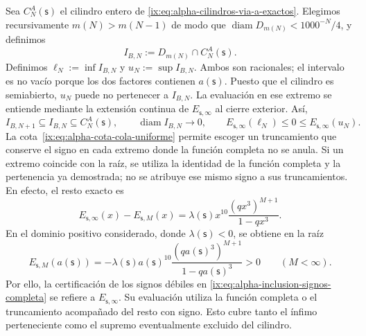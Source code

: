 Sea \(C_N^A(\mathsf s)\) el cilindro entero de
\eqref{ix:eq:alpha-cilindros-via-a-exactos}. Elegimos recursivamente
\(m(N)>m(N-1)\) de modo que
\(\operatorname{diam}D_{m(N)}<1000^{-N}/4\), y definimos
\begin{equation}
I_{B,N}:=D_{m(N)}\cap C_N^A(\mathsf s).
 \label{ix:eq:alpha-intervalos-b-completos}
\end{equation}
Definimos
\(\ell_N:=\inf I_{B,N}\) y \(u_N:=\sup I_{B,N}\). Ambos son racionales;
el intervalo es no vacío porque los dos factores contienen
\(a(\mathsf s)\). Puesto que el cilindro es semiabierto, \(u_N\) puede no
pertenecer a \(I_{B,N}\). La evaluación en ese extremo se entiende mediante
la extensión continua de \(E_{\mathsf s,\infty}\) al cierre exterior. Así,
\begin{equation}
 I_{B,N+1}\subseteq I_{B,N}\subseteq C_N^A(\mathsf s),
 \qquad \operatorname{diam}I_{B,N}\longrightarrow0,
 \qquad E_{\mathsf s,\infty}(\ell_N)\leq0\leq
 E_{\mathsf s,\infty}(u_N).
 \label{ix:eq:alpha-inclusion-signos-completa}
\end{equation}
La cota~\eqref{ix:eq:alpha-cota-cola-uniforme} permite escoger un
truncamiento que conserve el signo en cada extremo donde la función completa
no se anula. Si un extremo coincide con la raíz, se utiliza la identidad de
la función completa y la pertenencia ya demostrada; no se atribuye ese mismo
signo a sus truncamientos. En efecto, el resto exacto es
\[
 E_{\mathsf s,\infty}(x)-E_{\mathsf s,M}(x)
 =\lambda(\mathsf s)x^{10}
   \frac{(qx^3)^{M+1}}{1-qx^3}.
\]
En el dominio positivo considerado, donde \(\lambda(\mathsf s)<0\), se
obtiene en la raíz
\[
 E_{\mathsf s,M}(a(\mathsf s))
 =-\lambda(\mathsf s)a(\mathsf s)^{10}
   \frac{(qa(\mathsf s)^3)^{M+1}}{1-qa(\mathsf s)^3}>0
 \qquad(M<\infty).
\]
Por ello, la certificación de los signos débiles en
\eqref{ix:eq:alpha-inclusion-signos-completa} se refiere a
\(E_{\mathsf s,\infty}\). Su evaluación utiliza la función completa o el
truncamiento acompañado del resto con signo. Esto cubre tanto el ínfimo
perteneciente como el supremo eventualmente excluido del cilindro.

